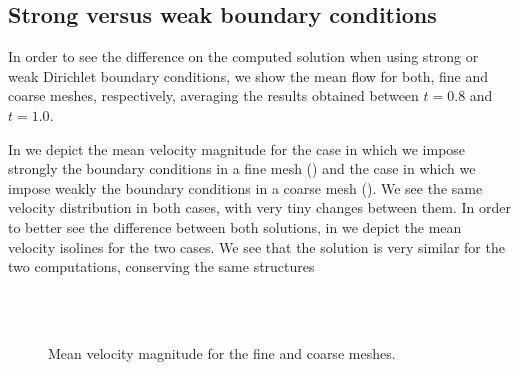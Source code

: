 \subsection{Strong versus weak boundary conditions}
In order to see the difference on the computed solution when using strong or weak Dirichlet boundary conditions, we show the mean flow for both, fine and coarse meshes, respectively, averaging the results obtained between $ t=0.8 $ and $ t=1.0 $.

In  we depict the mean velocity magnitude for the case in which we impose strongly the boundary conditions in a fine mesh () and the case in which we impose weakly the boundary conditions in a coarse mesh (). We see the same velocity distribution in both cases, with very tiny changes between them. In order to better see the difference between both solutions, in  we depict the mean velocity isolines for the two cases. We see that the solution is very similar for the two computations, conserving the same structures 
\begin{figure}[h!]
  \centering
  \\
  \\
  \caption{Mean velocity magnitude for the fine and coarse meshes.}
  \label{fig-NACA_mean_velo}
\end{figure}
